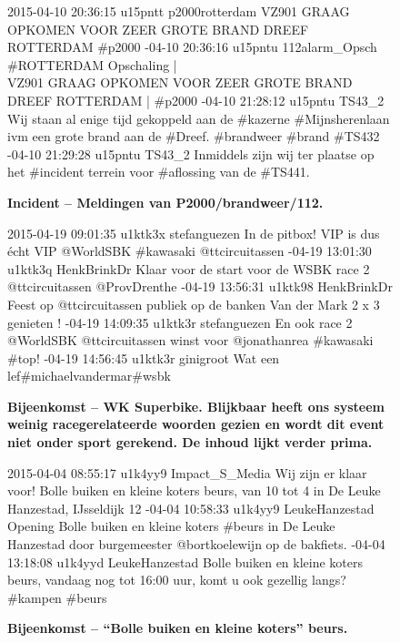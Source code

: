 {{\vspace*{-17pt} 
\begin{figure}[H]
 \caption{\bf{Incident} – Meldingen van P2000/brandweer/112.}
\vspace*{-10pt} 
\begin{framed}
\footnotesize{
2015-04-10 20:36:15 u15pntt p2000rotterdam VZ901 GRAAG OPKOMEN VOOR ZEER GROTE BRAND DREEF ROTTERDAM \#p2000
-04-10 20:36:16 u15pntu 112alarm\_Opsch \#ROTTERDAM Opschaling | \\VZ901 GRAAG OPKOMEN VOOR ZEER GROTE BRAND DREEF ROTTERDAM | \#p2000
-04-10 21:28:12 u15pntu TS43\_2 Wij staan al enige tijd gekoppeld aan de \#kazerne \#Mijnsherenlaan ivm een grote brand aan de \#Dreef. \#brandweer \#brand \#TS432
-04-10 21:29:28 u15pntu TS43\_2 Inmiddels zijn wij ter plaatse op het \#incident terrein voor \#aflossing van de \#TS441.
}
\end{framed}
\end{figure}

\vspace*{-17pt} 
\begin{figure}[H]
 \caption{\bf{Bijeenkomst} – WK Superbike. Blijkbaar heeft ons systeem weinig racegerelateerde woorden gezien en wordt dit event niet onder sport gerekend. De inhoud lijkt verder prima.}
\vspace*{-10pt} 
\begin{framed}
\footnotesize{
2015-04-19 09:01:35 u1ktk3x stefanguezen In de pitbox! VIP is dus écht VIP @WorldSBK \#kawasaki @ttcircuitassen
-04-19 13:01:30 u1ktk3q HenkBrinkDr Klaar voor de start voor de WSBK race 2 @ttcircuitassen @ProvDrenthe
-04-19 13:56:31 u1ktk98 HenkBrinkDr Feest op @ttcircuitassen publiek op de banken Van der Mark 2 x 3 genieten !
-04-19 14:09:35 u1ktk3r stefanguezen En ook race 2 @WorldSBK @ttcircuitassen winst voor @jonathanrea \#kawasaki \#top!
-04-19 14:56:45 u1ktk3r ginigroot Wat een lef\#michaelvandermar\#wsbk}
\end{framed}
\end{figure}

\vspace*{-17pt} 
\begin{figure}[H]
 \caption{\bf{Bijeenkomst} – ``Bolle buiken en kleine koters'' beurs.}
\vspace*{-10pt} 
\begin{framed}
\footnotesize{
2015-04-04 08:55:17 u1k4yy9 Impact\_S\_Media Wij zijn er klaar voor! Bolle buiken en kleine koters beurs, van 10 tot 4 in De Leuke Hanzestad, IJsseldijk 12
-04-04 10:58:33 u1k4yy9 LeukeHanzestad Opening Bolle buiken en kleine koters \#beurs in De Leuke Hanzestad door burgemeester @bortkoelewijn op de bakfiets.
-04-04 13:18:08 u1k4yyd LeukeHanzestad Bolle buiken en kleine koters beurs, vandaag nog tot 16:00 uur, komt u ook gezellig langs? \#kampen \#beurs}
\end{framed}
\end{figure}
 
}}
